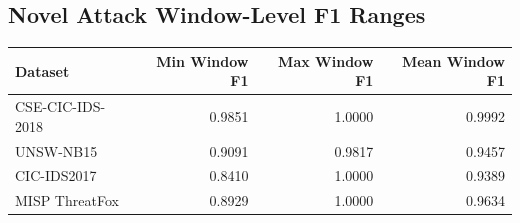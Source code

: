 \documentclass[12pt, letterpaper, oneside]{report}
\begin{document}
\begin{appendices}
\section{Novel Attack Window-Level F1 Ranges}

\begin{center}
\begin{tabular}{lrrr}
\toprule
\textbf{Dataset} & \textbf{Min Window F1} & \textbf{Max Window F1} & \textbf{Mean Window F1} \\
\midrule
CSE-CIC-IDS-2018 & 0.9851 & 1.0000 & 0.9992 \\
UNSW-NB15 & 0.9091 & 0.9817 & 0.9457 \\
CIC-IDS2017 & 0.8410 & 1.0000 & 0.9389 \\
MISP ThreatFox & 0.8929 & 1.0000 & 0.9634 \\
\bottomrule
\end{tabular}
\end{center}

\end{appendices}
\end{document}
